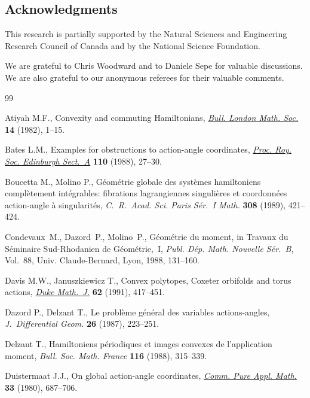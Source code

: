\documentclass[pdftex]{sigma}
\numberwithin{equation}{section}
\begin{document}
\subsection*{Acknowledgments}
This research is partially supported by the Natural Sciences
and Engineering Research Council of Canada  and by the National
Science Foundation.

We are grateful to Chris Woodward and to Daniele Sepe
for valuable discussions.
We are also grateful to our anonymous referees for their valuable comments.

\begin{thebibliography}{99}
\footnotesize \itemsep=0pt

Atiyah M.F., Convexity and commuting {H}amiltonians, \href{http://dx.doi.org/10.1112/blms/14.1.1}{\textit{Bull. London Math.
  Soc.}} \textbf{14} (1982), 1--15.

Bates L.M., Examples for obstructions to action-angle coordinates,
  \href{http://dx.doi.org/10.1017/S0308210500024823}{\textit{Proc. Roy. Soc. Edinburgh Sect.~A}} \textbf{110} (1988), 27--30.

Boucetta M., Molino P., G\'eom\'etrie globale des syst\`emes hamiltoniens
  compl\`etement int\'egrables: f\/ibrations lagrangiennes singuli\`eres et
  coordonn\'ees action-angle \`a singularit\'es, \textit{C.~R.~Acad. Sci. Paris
  S\'er.~I Math.} \textbf{308} (1989), 421--424.

Condevaux~M., Dazord~P.,  Molino~P.,
G\'eom\'etrie du moment,
in Travaux du {S}\'eminaire {S}ud-{R}hodanien de {G}\'eom\'etrie,~{I},
\textit{Publ. D\'ep. Math. Nouvelle S\'er.~B}, Vol.~88,
Univ. Claude-Bernard,
Lyon, 1988, 131--160.

Davis M.W., Januszkiewicz T., Convex polytopes, {C}oxeter orbifolds and torus
  actions, \href{http://dx.doi.org/10.1215/S0012-7094-91-06217-4}{\textit{Duke Math.~J.}} \textbf{62} (1991), 417--451.

Dazord P., Delzant T., Le probl\`eme g\'en\'eral des variables actions-angles,
  \textit{J.~Differential Geom.} \textbf{26} (1987), 223--251.

Delzant T., Hamiltoniens p\'eriodiques et images convexes de l'application
  moment, \textit{Bull. Soc. Math. France} \textbf{116} (1988), 315--339.

Duistermaat J.J., On global action-angle coordinates, \href{http://dx.doi.org/10.1002/cpa.3160330602}{\textit{Comm. Pure Appl.
  Math.}} \textbf{33} (1980), 687--706.


\end{thebibliography}
\end{document}
